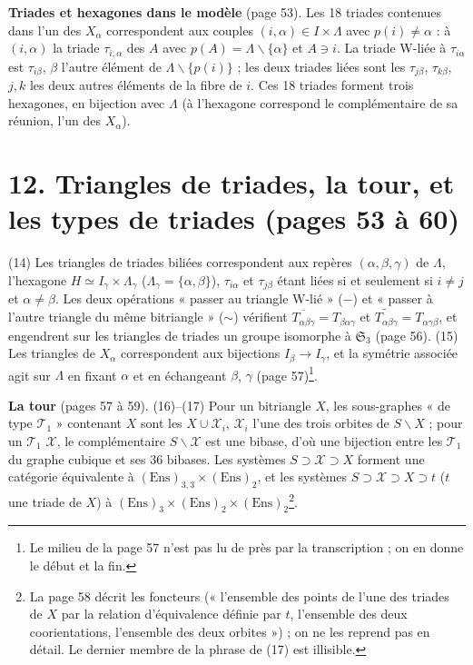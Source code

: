 \documentclass[11pt,a4paper]{article}
\begin{document}
\textbf{Triades et hexagones dans le modèle} (page 53). Les 18 triades
contenues dans l'un des $X_\alpha$ correspondent aux couples $(i, \alpha) \in I
\times \Lambda$ avec $p(i) \neq \alpha$ : à $(i, \alpha)$ la triade
$\tau_{i,\alpha}$ des $A$ avec $p(A) = \Lambda \smallsetminus \lbrace
\alpha\rbrace$ et $A \ni i$. La triade W-liée à $\tau_{i\alpha}$ est
$\tau_{i\beta}$, $\beta$ l'autre élément de $\Lambda \smallsetminus \lbrace
p(i)\rbrace$ ; les deux triades liées sont les $\tau_{j\beta}$, $\tau_{k\beta}$,
$j, k$ les deux autres éléments de la fibre de $i$. Ces 18 triades forment
trois hexagones, en bijection avec $\Lambda$ (à l'hexagone correspond le
complémentaire de sa réunion, l'un des $X_\alpha$).

\section*{12. Triangles de triades, la tour, et les types de triades (pages 53 à 60)}

(14) Les triangles de triades biliées correspondent aux repères $(\alpha,
\beta, \gamma)$ de $\Lambda$, l'hexagone $H \simeq I_\gamma \times \Lambda_\gamma$
($\Lambda_\gamma = \lbrace \alpha, \beta\rbrace$), $\tau_{i\alpha}$ et
$\tau_{j\beta}$ étant liées si et seulement si $i \neq j$ et $\alpha \neq
\beta$. Les deux opérations « passer au triangle W-lié » ($-$) et « passer à
l'autre triangle du même bitriangle » ($\sim$) vérifient $\overline{T_{\alpha
\beta\gamma}} = T_{\beta\alpha\gamma}$ et $\widetilde{T_{\alpha\beta\gamma}} =
T_{\alpha\gamma\beta}$, et engendrent sur les triangles de triades un groupe
isomorphe à $\mathfrak{S}_3$ (page 56). (15) Les triangles de $X_\alpha$
correspondent aux bijections $I_\beta \to I_\gamma$, et la symétrie associée
agit sur $\Lambda$ en fixant $\alpha$ et en échangeant $\beta$, $\gamma$
(page 57)\footnote{Le milieu de la page 57 n'est pas lu de près par la
transcription ; on en donne le début et la fin.}.

\textbf{La tour} (pages 57 à 59). (16)--(17) Pour un bitriangle $X$, les
sous-graphes « de type $\mathcal{T}_1$ » contenant $X$ sont les $X \cup
\mathcal{X}_i$, $\mathcal{X}_i$ l'une des trois orbites de $S \smallsetminus X$ ;
pour un $\mathcal{T}_1$ $\mathcal{X}$, le complémentaire $S \smallsetminus
\mathcal{X}$ est une bibase, d'où une bijection entre les $\mathcal{T}_1$ du
graphe cubique et ses 36 bibases. Les systèmes $S \supset \mathcal{X}
\supset X$ forment une catégorie équivalente à $(\mathrm{Ens})_{3,3} \times
(\mathrm{Ens})_2$, et les systèmes $S \supset \mathcal{X} \supset X \supset t$
($t$ une triade de $X$) à $(\mathrm{Ens})_3 \times (\mathrm{Ens})_2 \times
(\mathrm{Ens})_2$\footnote{La page 58 décrit les foncteurs (« l'ensemble des
points de l'une des triades de $X$ par la relation d'équivalence définie par
$t$, l'ensemble des deux coorientations, l'ensemble des deux orbites ») ; on ne
les reprend pas en détail. Le dernier membre de la phrase de (17) est
illisible.}.
\end{document}
